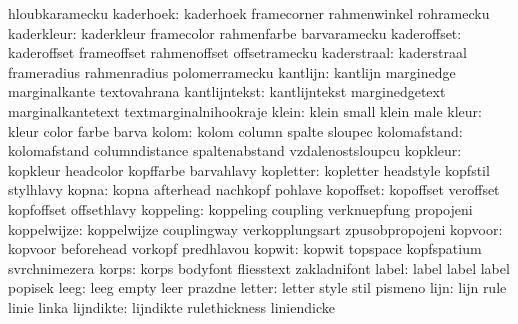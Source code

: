                        hloubkaramecku
           kaderhoek:  kaderhoek            framecorner          rahmenwinkel
                       rohramecku
          kaderkleur:  kaderkleur           framecolor           rahmenfarbe
                       barvaramecku
         kaderoffset:  kaderoffset          frameoffset          rahmenoffset
                       offsetramecku
         kaderstraal:  kaderstraal          frameradius          rahmenradius
                       polomerramecku
            kantlijn:  kantlijn             marginedge           marginalkante
                       textovahrana
       kantlijntekst:  kantlijntekst        marginedgetext       marginalkantetext
                       textmarginalnihookraje
               klein:  klein                small                klein
                       male
               kleur:  kleur                color                farbe
                       barva
               kolom:  kolom                column               spalte
                       sloupec
        kolomafstand:  kolomafstand         columndistance       spaltenabstand
                       vzdalenostsloupcu
            kopkleur:  kopkleur             headcolor            kopffarbe
                       barvahlavy
           kopletter:  kopletter            headstyle            kopfstil
                       stylhlavy
               kopna:  kopna                afterhead            nachkopf
                       pohlave
           kopoffset:  kopoffset            veroffset            kopfoffset
                       offsethlavy
           koppeling:  koppeling            coupling             verknuepfung
                       propojeni
         koppelwijze:  koppelwijze          couplingway          verkopplungsart
                       zpusobpropojeni
             kopvoor:  kopvoor              beforehead           vorkopf
                       predhlavou
              kopwit:  kopwit               topspace             kopfspatium
                       svrchnimezera
               korps:  korps                bodyfont             fliesstext
                       zakladnifont
               label:  label                label                label
                       popisek
                leeg:  leeg                 empty                leer
                       prazdne
              letter:  letter               style                stil
                       pismeno
                lijn:  lijn                 rule                 linie
                       linka
           lijndikte:  lijndikte            rulethickness        liniendicke
